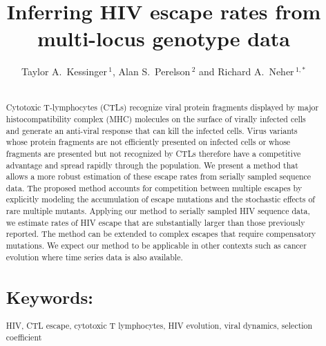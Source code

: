 \documentclass{frontiers}
\def\firstAuthorLast{Kessinger {et~al}} %
\def\Authors{Taylor A.~Kessinger\,$^{1}$, Alan S.~Perelson\,$^{2}$ and
  Richard A.~Neher\,$^{1,*}$}
\begin{document}
\onecolumn
{}

\title[Inferring HIV escape rates]{Inferring HIV escape rates from multi-locus genotype data}
\author[\firstAuthorLast ]{\Authors}
\address{}
\correspondance{}
\editor{}

\maketitle

\begin{abstract}
\section{}
Cytotoxic T-lymphocytes (CTLs) recognize viral protein fragments displayed by major histocompatibility complex (MHC) molecules on the surface of virally infected cells and generate an anti-viral response that can kill the infected cells. Virus variants whose protein fragments are not efficiently presented on infected cells or whose fragments are presented but not recognized by CTLs therefore have a competitive advantage and spread rapidly through the population. We present a method that allows a more robust estimation of these escape rates from serially sampled sequence data. The proposed method accounts for competition between multiple escapes by explicitly modeling the accumulation of escape mutations and the stochastic effects of rare multiple mutants. Applying our method to serially sampled HIV sequence data, we estimate rates of HIV escape that are substantially larger than those previously reported. The method can be extended to complex escapes that require compensatory mutations. We expect our method to be applicable in other contexts such as cancer evolution where time series data is also available.
\tiny
\section{Keywords:} HIV,  CTL escape, cytotoxic T lymphocytes, HIV evolution, viral dynamics, selection coefficient
\end{abstract}
\end{document}
